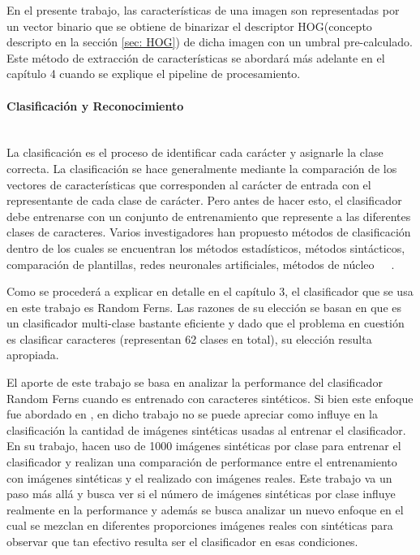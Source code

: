 		  	En el presente trabajo, las características de una imagen son representadas por un vector binario que se obtiene de binarizar el descriptor HOG(concepto descripto en la sección \ref{sec: HOG}) de dicha imagen con un umbral pre-calculado. Este método de extracción de características se abordará más adelante en el capítulo 4 cuando se explique el pipeline de procesamiento.
	  
		\paragraph{Clasificación y Reconocimiento} ~\\
		
		La clasificación es el proceso de identificar cada carácter y asignarle la clase correcta. La clasificación se hace generalmente mediante la comparación de los vectores de características que corresponden al carácter de entrada con el representante de cada clase de carácter. Pero antes de hacer esto, el clasificador debe entrenarse con un conjunto de entrenamiento que represente a las diferentes clases de caracteres. Varios investigadores han propuesto métodos de clasificación dentro de los cuales se encuentran los métodos estadísticos, métodos sintácticos, comparación de plantillas, redes neuronales artificiales, métodos de núcleo~\cite{NNSJ}~\cite{SA96}~\cite{RYVY2010}.
		
		Como se procederá a explicar en detalle en el capítulo 3, el clasificador que se usa en este trabajo es Random Ferns. Las razones de su elección se basan en que es un clasificador multi-clase bastante eficiente y dado que el problema en cuestión es clasificar caracteres (representan 62 clases en total), su elección resulta apropiada.
		
		El aporte de este trabajo se basa en analizar la performance del clasificador Random Ferns cuando es entrenado con caracteres sintéticos. Si bien este enfoque fue abordado en \cite{wang}, en dicho trabajo no se puede apreciar como influye en la clasificación la cantidad de imágenes sintéticas usadas al entrenar el clasificador. En su trabajo, hacen uso de 1000 imágenes sintéticas por clase para entrenar el clasificador y realizan una comparación de performance entre el entrenamiento con imágenes sintéticas y el realizado con imágenes reales. Este trabajo va un paso más allá y busca ver si el número de imágenes sintéticas por clase influye realmente en la performance y además se busca analizar un nuevo enfoque en el cual se mezclan en diferentes proporciones imágenes reales con sintéticas para observar que tan efectivo resulta ser el clasificador en esas condiciones.
		
